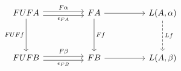 \[\begin{tikzcd}
	FUFA && FA && {L(A,\alpha)} \\
	\\
	FUFB && FB && {L(A,\beta)}
	\arrow["F\alpha", shift left, from=1-1, to=1-3]
	\arrow["{\epsilon_{FA}}"', shift right, from=1-1, to=1-3]
	\arrow[from=1-3, to=1-5]
	\arrow["F\beta", shift left, from=3-1, to=3-3]
	\arrow["{\epsilon_{FB}}"', shift right, from=3-1, to=3-3]
	\arrow[from=3-3, to=3-5]
	\arrow["FUFf"', from=1-1, to=3-1]
	\arrow["Ff", from=1-3, to=3-3]
	\arrow["Lf", dashed, from=1-5, to=3-5]
\end{tikzcd}\]